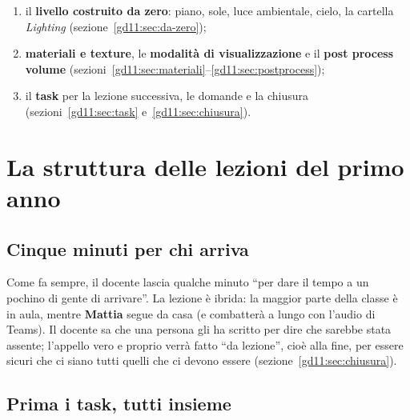 \begin{enumerate}
        (sezione~\ref{gd11:sec:starter});
  \item il \textbf{livello costruito da zero}: piano, sole, luce ambientale,
        cielo, la cartella \emph{Lighting}
        (sezione~\ref{gd11:sec:da-zero});
  \item \textbf{materiali e texture}, le \textbf{modalità di
        visualizzazione} e il \textbf{post process volume}
        (sezioni~\ref{gd11:sec:materiali}--\ref{gd11:sec:postprocess});
  \item il \textbf{task} per la lezione successiva, le domande e la chiusura
        (sezioni~\ref{gd11:sec:task} e~\ref{gd11:sec:chiusura}).
\end{enumerate}

\section{La struttura delle lezioni del primo anno}
\label{gd11:sec:struttura}

\subsection{Cinque minuti per chi arriva}

Come fa sempre, il docente lascia qualche minuto ``per dare il tempo a un
pochino di gente di arrivare''. La lezione è ibrida: la maggior parte della
classe è in aula, mentre \textbf{Mattia} segue da casa (e combatterà a lungo con
l'audio di Teams). Il docente sa che una persona gli ha scritto per dire che
sarebbe stata assente; l'appello vero e proprio verrà fatto ``da lezione'',
cioè alla fine, per essere sicuri che ci siano tutti quelli che ci devono
essere (sezione~\ref{gd11:sec:chiusura}).

\subsection{Prima i task, tutti insieme}

